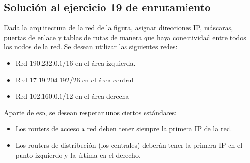 \documentclass[letterpaper,10pt,spanish]{sphinxmanual}
\begin{document}
\subsection{Solución al ejercicio 19 de enrutamiento}
\label{\detokenize{t2_integracion_elementos/ejercicios_subredes_ipv4/ejercicios_dos_router:solucion-al-ejercicio-19-de-enrutamiento}}
\sphinxAtStartPar
Dada la arquitectura de la red de la figura, asignar direcciones IP, máscaras, puertas de enlace y tablas de rutas de manera que haya conectividad entre todos
los nodos de la red. Se desean utilizar las siguientes redes:
\begin{itemize}
\item {} 
\sphinxAtStartPar
Red 190.232.0.0/16 en el área izquierda.

\item {} 
\sphinxAtStartPar
Red 17.19.204.192/26 en el área central.

\item {} 
\sphinxAtStartPar
Red 102.160.0.0/12 en el área derecha

\end{itemize}

\begin{figure}[htbp]
\centering

\noindent{}
\end{figure}

\sphinxAtStartPar
Aparte de eso, se desean respetar unos ciertos estándares:
\begin{itemize}
\item {} 
\sphinxAtStartPar
Los routers de acceso a red deben tener siempre la primera IP de la red.

\item {} 
\sphinxAtStartPar
Los routers de distribución (los centrales) deberán tener la primera IP en el punto izquierdo y la última en el derecho.

\end{itemize}
\end{document}
